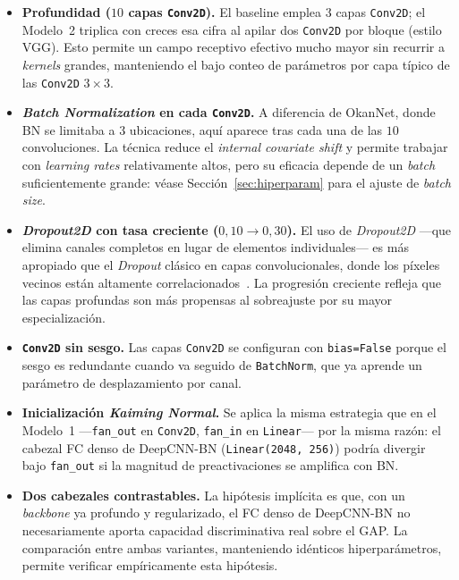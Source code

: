 \begin{itemize}
  \item \textbf{Profundidad ($10$ capas \texttt{Conv2D}).} El
        baseline emplea $3$ capas \texttt{Conv2D}; el Modelo~2
        triplica con creces esa cifra al apilar dos
        \texttt{Conv2D} por bloque (estilo VGG). Esto permite
        un campo receptivo efectivo mucho mayor sin recurrir a
        \textit{kernels} grandes, manteniendo el bajo conteo
        de parámetros por capa típico de las
        \texttt{Conv2D} $3{\times}3$.
  \item \textbf{\textit{Batch Normalization} en cada
        \texttt{Conv2D}.} A diferencia de OkanNet, donde BN se
        limitaba a $3$ ubicaciones, aquí aparece tras cada una
        de las $10$ convoluciones. La técnica reduce el
        \textit{internal covariate shift} y permite trabajar con
        \textit{learning rates} relativamente altos, pero su
        eficacia depende de un \textit{batch} suficientemente
        grande: véase Sección~\ref{sec:hiperparam} para el
        ajuste de \textit{batch size}.
  \item \textbf{\textit{Dropout2D} con tasa creciente
        ($0{,}10 \to 0{,}30$).} El uso de \textit{Dropout2D}
        ---que elimina canales completos en lugar de elementos
        individuales--- es más apropiado que el \textit{Dropout}
        clásico en capas convolucionales, donde los píxeles
        vecinos están altamente correlacionados~\cite{tompson2015efficient}.
        La progresión creciente refleja que las capas profundas
        son más propensas al sobreajuste por su mayor
        especialización.
  \item \textbf{\texttt{Conv2D} sin sesgo.} Las capas
        \texttt{Conv2D} se configuran con \texttt{bias=False}
        porque el sesgo es redundante cuando va seguido de
        \texttt{BatchNorm}, que ya aprende un parámetro de
        desplazamiento por canal.
  \item \textbf{Inicialización \textit{Kaiming Normal}.} Se
        aplica la misma estrategia que en el Modelo~1
        ---\texttt{fan\_out} en \texttt{Conv2D},
        \texttt{fan\_in} en \texttt{Linear}--- por la misma
        razón: el cabezal FC denso de DeepCNN-BN
        (\texttt{Linear(2048, 256)}) podría divergir bajo
        \texttt{fan\_out} si la magnitud de preactivaciones se
        amplifica con BN.
  \item \textbf{Dos cabezales contrastables.} La hipótesis
        implícita es que, con un \textit{backbone} ya profundo
        y regularizado, el FC denso de DeepCNN-BN no
        necesariamente aporta capacidad discriminativa real
        sobre el GAP. La comparación entre ambas variantes,
        manteniendo idénticos hiperparámetros, permite verificar
        empíricamente esta hipótesis.
\end{itemize}

